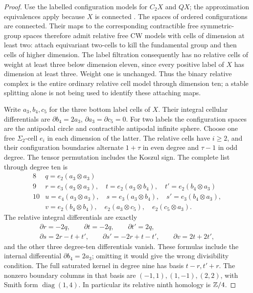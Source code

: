 \begin{proof}
Use the labelled configuration models for $C_2X$ and $QX$;
the approximation equivalences apply because $X$ is connected
\cite[Construction~2.4; Theorem~6.1]{May1972}.
The spaces of ordered configurations are connected. Their
maps to the corresponding contractible free symmetric-group
spaces therefore admit relative free CW models with cells
of dimension at least two: attach equivariant two-cells to
kill the fundamental group and then cells of higher dimension.
The label filtration consequently has no relative cells of
weight at least three below dimension eleven, since every
positive label of $X$ has dimension at least three.
Weight one is unchanged. Thus the binary relative complex
is the entire ordinary relative cell model through dimension
ten; a stable splitting alone is not being used to identify
these attaching maps.

Write $a_3,b_4,c_5$ for the three bottom label cells of $X$.
Their integral cellular differentials are
$\partial b_4=2a_3$, $\partial a_3=\partial c_5=0$.
For two labels the configuration spaces are the antipodal
circle and contractible antipodal infinite sphere. Choose
one free $\Sigma_2$-cell $e_i$ in each dimension of the
latter. The relative cells have $i\ge2$, and their
configuration boundaries alternate $1+\tau$ in even
degree and $\tau-1$ in odd degree. The tensor permutation
includes the Koszul sign. The complete list through degree
ten is
\[
\begin{array}{c|l}
8&q=e_2(a_3\otimes a_3)\\
9&r=e_3(a_3\otimes a_3),\quad
  t=e_2(a_3\otimes b_4),\quad
  t'=e_2(b_4\otimes a_3)\\
10&u=e_4(a_3\otimes a_3),\quad
  s=e_3(a_3\otimes b_4),\quad
  s'=e_3(b_4\otimes a_3),\\
 &v=e_2(b_4\otimes b_4),\quad
  e_2(a_3\otimes c_5),\quad e_2(c_5\otimes a_3).
\end{array}
 \tag{D.2.21b}
\]
The relative integral differentials are exactly
\[
\begin{gathered}
 \partial r=-2q,\qquad \partial t=-2q,
 \qquad \partial t'=2q,\\
 \partial s=2r-t+t',\qquad
 \partial s'=-2r+t-t',\qquad
 \partial v=2t+2t',
\end{gathered}
 \tag{D.2.21c}
\]
and the other three degree-ten differentials vanish.
These formulas include the internal differential
$\partial b_4=2a_3$; omitting it would give the wrong
divisibility condition. The full saturated kernel in
degree nine has basis $t-r,t'+r$. The nonzero boundary
columns in that basis are $(-1,1),(1,-1),(2,2)$, with
Smith form $\operatorname{diag}(1,4)$. In particular its
relative ninth homology is $\mathbb Z/4$.


\end{proof}
